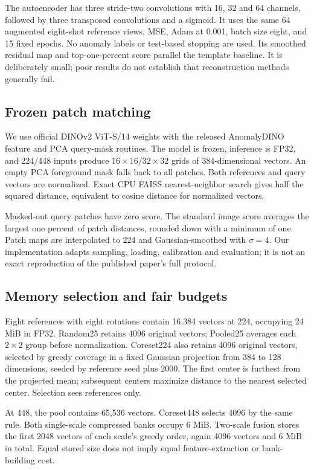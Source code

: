 \documentclass[10pt,twocolumn,letterpaper]{article}
\begin{document}
The autoencoder has three stride-two convolutions with 16, 32 and 64 channels, followed by three transposed convolutions and a sigmoid. It uses the same 64 augmented eight-shot reference views, MSE, Adam at 0.001, batch size eight, and 15 fixed epochs. No anomaly labels or test-based stopping are used. Its smoothed residual map and top-one-percent score parallel the template baseline. It is deliberately small; poor results do not establish that reconstruction methods generally fail.
\subsection{Frozen patch matching}
We use official DINOv2 ViT-S/14 weights with the released AnomalyDINO feature and PCA query-mask routines. The model is frozen, inference is FP32, and 224/448 inputs produce $16\times16$/$32\times32$ grids of 384-dimensional vectors. An empty PCA foreground mask falls back to all patches. Both references and query vectors are normalized. Exact CPU FAISS nearest-neighbor search gives half the squared distance, equivalent to cosine distance for normalized vectors.

Masked-out query patches have zero score. The standard image score averages the largest one percent of patch distances, rounded down with a minimum of one. Patch maps are interpolated to 224 and Gaussian-smoothed with $\sigma=4$. Our implementation adapts sampling, loading, calibration and evaluation; it is not an exact reproduction of the published paper's full protocol.
\subsection{Memory selection and fair budgets}
Eight references with eight rotations contain 16,384 vectors at 224, occupying 24 MiB in FP32. Random25 retains 4096 original vectors; Pooled25 averages each $2\times2$ group before normalization. Coreset224 also retains 4096 original vectors, selected by greedy coverage in a fixed Gaussian projection from 384 to 128 dimensions, seeded by reference seed plus 2000. The first center is furthest from the projected mean; subsequent centers maximize distance to the nearest selected center. Selection sees references only.

At 448, the pool contains 65,536 vectors. Coreset448 selects 4096 by the same rule. Both single-scale compressed banks occupy 6 MiB. Two-scale fusion stores the first 2048 vectors of each scale's greedy order, again 4096 vectors and 6 MiB in total. Equal stored size does not imply equal feature-extraction or bank-building cost.
\end{document}
